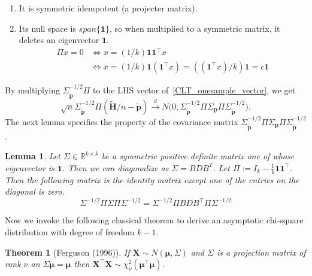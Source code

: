 \documentclass[11pt]{article} %
\newcommand{\real}{\mathbb{R}} %
\newtheorem{theorem}{Theorem}[section]
\newtheorem{lemma}{Lemma}[section]
\begin{document}
\begin{enumerate}
	\item It is symmetric idempotent (a projecter matrix).
	\item Its null space is $span\{\boldsymbol{1}\}$, so when multiplied to a symmetric matrix, it deletes an eigenvector $\boldsymbol{1}$.
	\begin{align*}
		\Pi x  = 0
		&\iff
		x = (1/k) \boldsymbol{1} \boldsymbol{1}^\top x
		\\&
		\iff
		x = (1/k) \boldsymbol{1} (\boldsymbol{1}^\top x) = ((\boldsymbol{1}^\top x)/k) \boldsymbol{1} = c\boldsymbol{1}
	\end{align*}
\end{enumerate}
By multiplying $\Sigma_{\boldsymbol{\tilde{p}}}^{-1/2} \Pi$ to the LHS vector of~\eqref{CLT_onesample_vector}, we get
\begin{equation}
	\sqrt{n}
	\Sigma_{\boldsymbol{\tilde{p}}}^{-1/2} \Pi
	(\tilde{\boldsymbol{H}}/n - \tilde{\boldsymbol{p}})
	\stackrel{d}{\to}
	N
	\bigl(
	0,
	\Sigma_{\boldsymbol{\tilde{p}}}^{-1/2} \Pi \Sigma_{\boldsymbol{p}} \Pi \Sigma_{\boldsymbol{\tilde{p}}}^{-1/2}
	\bigr).
\end{equation}
The next lemma specifies the property of the covariance matrix $\Sigma_{\boldsymbol{\tilde{p}}}^{-1/2} \Pi \Sigma_{\boldsymbol{p}} \Pi \Sigma_{\boldsymbol{\tilde{p}}}^{-1/2}$.
\begin{lemma}\label{chisq_projection}
	Let $\Sigma \in \real^{k \times k}$ be a symmetric positive definite matrix one of whose eigenvector is $\boldsymbol{1}$. Then we can diagonalize as $\Sigma = BDB^T$.
	Let $\Pi := I_k - \frac{1}{k} \boldsymbol{1} \boldsymbol{1}^\top$.
	Then the following matrix is the identity matrix except one of the entries on the diagonal is zero.
	\begin{equation}
		\Sigma^{-1/2} \Pi \Sigma \Pi \Sigma^{-1/2}
		=
		\Sigma^{-1/2} \Pi BDB^\top \Pi \Sigma^{-1/2}		
	\end{equation}
\end{lemma}
\noindent
	Now we invoke the following classical theorem to derive an asymptotic chi-square distribution with degree of freedom $k-1$.
\begin{theorem}[Ferguson (1996)]\label{chisq_theorem}
	If $\boldsymbol{X} \sim N( \boldsymbol{\mu}, \Sigma)$ and $\Sigma$ is a projection matrix of rank $\nu$ an
	$\Sigma \boldsymbol{\mu} = \boldsymbol{\mu}$ then $\boldsymbol{X}^\top \boldsymbol{X} \sim \chi^2_{\nu} (\boldsymbol{\mu}^\top \boldsymbol{\mu})$.
\end{theorem}
\end{document}
